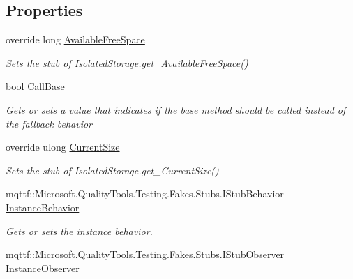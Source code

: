 \subsection*{Properties}
\begin{DoxyCompactItemize}
\item 
override long \hyperlink{class_system_1_1_i_o_1_1_isolated_storage_1_1_fakes_1_1_stub_isolated_storage_a4b15e469aeba32bc640a07dbf19bcfdf}{Available\-Free\-Space}
\begin{DoxyCompactList}\small\item\em Sets the stub of Isolated\-Storage.\-get\-\_\-\-Available\-Free\-Space()\end{DoxyCompactList}\item 
bool \hyperlink{class_system_1_1_i_o_1_1_isolated_storage_1_1_fakes_1_1_stub_isolated_storage_a66e73b48638f408a2835400ac00ede24}{Call\-Base}
\begin{DoxyCompactList}\small\item\em Gets or sets a value that indicates if the base method should be called instead of the fallback behavior\end{DoxyCompactList}\item 
override ulong \hyperlink{class_system_1_1_i_o_1_1_isolated_storage_1_1_fakes_1_1_stub_isolated_storage_af816e68ba851b95fc19d18117580037d}{Current\-Size}
\begin{DoxyCompactList}\small\item\em Sets the stub of Isolated\-Storage.\-get\-\_\-\-Current\-Size()\end{DoxyCompactList}\item 
mqttf\-::\-Microsoft.\-Quality\-Tools.\-Testing.\-Fakes.\-Stubs.\-I\-Stub\-Behavior \hyperlink{class_system_1_1_i_o_1_1_isolated_storage_1_1_fakes_1_1_stub_isolated_storage_a307aa15f2219c2a7a0b4f1cc0b427988}{Instance\-Behavior}
\begin{DoxyCompactList}\small\item\em Gets or sets the instance behavior.\end{DoxyCompactList}\item 
mqttf\-::\-Microsoft.\-Quality\-Tools.\-Testing.\-Fakes.\-Stubs.\-I\-Stub\-Observer \hyperlink{class_system_1_1_i_o_1_1_isolated_storage_1_1_fakes_1_1_stub_isolated_storage_acd2885af0f1cca57e1543f517647473d}{Instance\-Observer}

\end{DoxyCompactItemize}
